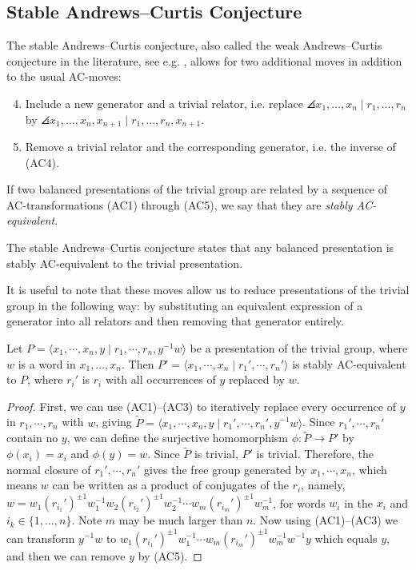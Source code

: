 
\subsection{Stable Andrews--Curtis Conjecture}

The stable Andrews--Curtis conjecture, also called the weak Andrews--Curtis conjecture in the literature, see e.g. \cite{MMS,Meier2016,Bagherifard2021}, allows for two additional moves in addition to the usual AC-moves:  
\begin{enumerate}[label=(AC\arabic*)]
	\setcounter{enumi}{3}
	\item Include a new generator and a trivial relator, i.e. replace $\angles{x_1, \dots, x_n \mid r_1, \dots, r_n}$ by $\angles{x_1, \dots, x_n, x_{n+1} \mid r_1, \dots, r_n, x_{n+1}}$.
	\item Remove a trivial relator and the corresponding generator, i.e. the inverse of (AC4).
\end{enumerate}

\begin{definition}
If two balanced presentations of the trivial group are related by a sequence of AC-transformations (AC1) through (AC5), we say that they are \textit{stably AC-equivalent}.
\end{definition}
The stable Andrews--Curtis conjecture states that any balanced presentation is stably AC-equivalent to the trivial presentation.

It is useful to note that these moves allow us to reduce presentations of the trivial group in the following way: by substituting an equivalent expression of a generator into all relators and then removing that generator entirely. 
\begin{lemma}[Substitution]
    \label{lem:substitution}
    Let $P=\langle x_1,\cdots, x_n, y \mid r_1,\cdots, r_n, y^{-1}w\rangle$ be a presentation of the trivial group, where $w$ is a word in $x_1,\ldots,x_n$. Then $P'=\langle x_1,\cdots, x_n \mid r_1',\cdots, r_n'\rangle$ is stably AC-equivalent to $P$, where $r_i'$ is $r_i$ with all occurrences of $y$ replaced by $w$.
\end{lemma}
\begin{proof}
    First, we can use (AC1)–(AC3) to iteratively replace every occurrence of $y$ in $r_1,\cdots,r_n$ with $w$, giving $\widetilde{P}=\langle x_1,\cdots,x_n,y\mid r_1',\cdots,r_n',y^{-1}w\rangle$. Since $r_1',\cdots,r_n'$ contain no $y$, we can define the surjective homomorphism $\phi:\widetilde{P}\longrightarrow P'$ by $\phi(x_i)=x_i$ and $\phi(y)=w$. Since $\widetilde{P}$ is trivial, $P'$ is trivial. Therefore, the normal closure of $r_1',\cdots, r_n'$ gives the free group generated by $x_1,\cdots, x_n$, which means $w$ can be written as a product of conjugates of the $r_i$, namely, $w=w_1 (r_{i_1}')^{\pm1}w_1^{-1}w_2 (r_{i_2}')^{\pm 1}w_2^{-1}\cdots w_m (r_{i_m}')^{\pm 1}w_m^{-1}$, for words $w_i$ in the $x_i$ and $i_k \in \{1,\ldots,n\}$. Note $m$ may be much larger than $n$. Now using (AC1)–(AC3) we can transform  $y^{-1}w$ to $w_1 (r_{i_1}')^{\pm1}w_1^{-1}\cdots w_m (r_{i_m}')^{\pm 1}w_m^{-1}w^{-1}y$ which equals $y$, and then we can remove $y$ by (AC5).
\end{proof}

